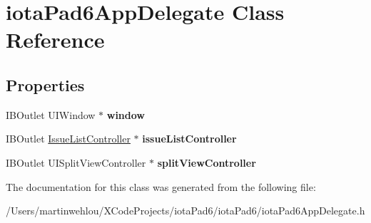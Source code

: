 \hypertarget{interfaceiota_pad6_app_delegate}{
\section{iotaPad6AppDelegate Class Reference}
\label{interfaceiota_pad6_app_delegate}
}
\subsection*{Properties}
\begin{DoxyCompactItemize}
\item 
\hypertarget{interfaceiota_pad6_app_delegate_ae17f6e2e08bf58ad5ea868c63b6a7b84}{
IBOutlet UIWindow $\ast$ {\bfseries window}}
\label{interfaceiota_pad6_app_delegate_ae17f6e2e08bf58ad5ea868c63b6a7b84}

\item 
\hypertarget{interfaceiota_pad6_app_delegate_a47a88e1e2b50402bb636c308bb197b3d}{
IBOutlet \hyperlink{interface_issue_list_controller}{IssueListController} $\ast$ {\bfseries issueListController}}
\label{interfaceiota_pad6_app_delegate_a47a88e1e2b50402bb636c308bb197b3d}

\item 
\hypertarget{interfaceiota_pad6_app_delegate_a9bde6d650c0a4a86169660a39c94fcf4}{
IBOutlet UISplitViewController $\ast$ {\bfseries splitViewController}}
\label{interfaceiota_pad6_app_delegate_a9bde6d650c0a4a86169660a39c94fcf4}

\end{DoxyCompactItemize}


The documentation for this class was generated from the following file:\begin{DoxyCompactItemize}
\item 
/Users/martinwehlou/XCodeProjects/iotaPad6/iotaPad6/iotaPad6AppDelegate.h\end{DoxyCompactItemize}
